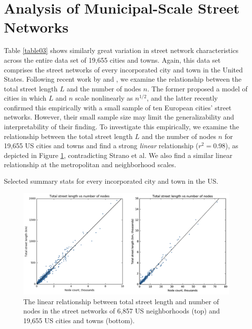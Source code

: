 \documentclass{article}
\begin{document}
\section{Analysis of Municipal-Scale Street Networks}

Table \ref{table03} shows similarly great variation in street network characteristics across the entire data set of 19,655 cities and towns. Again, this data set comprises the street networks of every incorporated city and town in the United States. Following recent work by \citet{barthelemy_modeling_2008} and \citet{strano_urban_2013}, we examine the relationship between the total street length $L$ and the number of nodes $n$. The former proposed a model of cities in which $L$ and $n$ scale nonlinearly as $n^{1/2}$, and the latter recently confirmed this empirically with a small sample of ten European cities' street networks. However, their small sample size may limit the generalizability and interpretability of their finding. To investigate this empirically, we examine the relationship between the total street length $L$ and the number of nodes $n$ for 19,655 US cities and towns and find a strong \emph{linear} relationship ($r^{2}=0.98$), as depicted in Figure \ref{fig03}, contradicting Strano et al. We also find a similar linear relationship at the metropolitan and neighborhood scales.

\begin{table}[hp]
\caption{Selected summary stats for every incorporated city and town in the US.}
\label{table03}
\end{table}

\begin{figure}[h]
	\includegraphics[width=1\textwidth]{media/fig03.png}
	\caption{The linear relationship between total street length and number of nodes in the street networks of 6,857 US neighborhoods (top) and 19,655 US cities and towns (bottom).}
	\label{fig03}
\end{figure}
\end{document}
